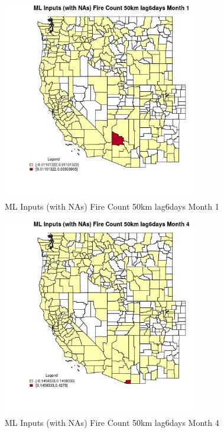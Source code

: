 \clearpage 

\begin{figure} 
\centering  
\includegraphics[width=0.77\textwidth]{Code_Outputs/Report_ML_input_PM25_Step4_part_e_de_duplicated_aves_compiled_2019-05-21wNAs_CountyFire_Count_50km_lag6daysmedianMonth1.jpg} 
\caption{\label{fig:Report_ML_input_PM25_Step4_part_e_de_duplicated_aves_compiled_2019-05-21wNAsCountyFire_Count_50km_lag6daysmedianMonth1}ML Inputs (with NAs) Fire Count 50km lag6days Month 1} 
\end{figure} 
 

\begin{figure} 
\centering  
\includegraphics[width=0.77\textwidth]{Code_Outputs/Report_ML_input_PM25_Step4_part_e_de_duplicated_aves_compiled_2019-05-21wNAs_CountyFire_Count_50km_lag6daysmedianMonth4.jpg} 
\caption{\label{fig:Report_ML_input_PM25_Step4_part_e_de_duplicated_aves_compiled_2019-05-21wNAsCountyFire_Count_50km_lag6daysmedianMonth4}ML Inputs (with NAs) Fire Count 50km lag6days Month 4} 
\end{figure} 
 

